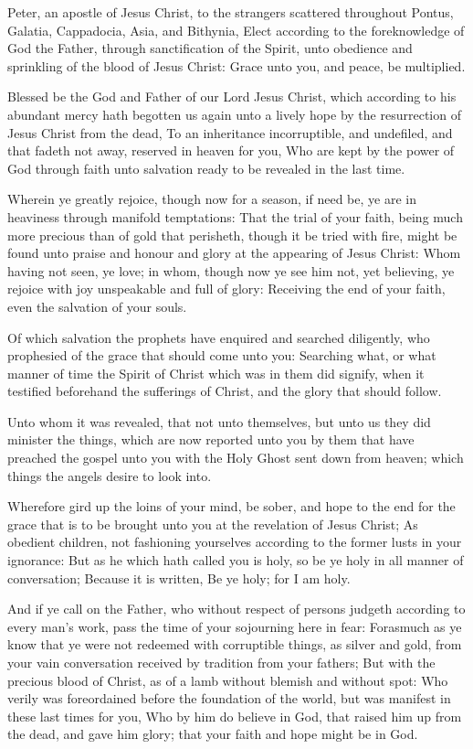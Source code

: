 \Chapter
\Verse Peter, an apostle of Jesus Christ, to the strangers scattered throughout Pontus, Galatia, Cappadocia, Asia, and Bithynia, \Verse Elect according to the foreknowledge of God the Father, through sanctification of the Spirit, unto obedience and sprinkling of the blood of Jesus Christ: Grace unto you, and peace, be multiplied.

\Verse Blessed be the God and Father of our Lord Jesus Christ, which according to his abundant mercy hath begotten us again unto a lively hope by the resurrection of Jesus Christ from the dead, \Verse To an inheritance incorruptible, and undefiled, and that fadeth not away, reserved in heaven for you, \Verse Who are kept by the power of God through faith unto salvation ready to be revealed in the last time.

\Verse Wherein ye greatly rejoice, though now for a season, if need be, ye are in heaviness through manifold temptations: \Verse That the trial of your faith, being much more precious than of gold that perisheth, though it be tried with fire, might be found unto praise and honour and glory at the appearing of Jesus Christ: \Verse Whom having not seen, ye love; in whom, though now ye see him not, yet believing, ye rejoice with joy unspeakable and full of glory: \Verse Receiving the end of your faith, even the salvation of your souls.

\Verse Of which salvation the prophets have enquired and searched diligently, who prophesied of the grace that should come unto you: \Verse Searching what, or what manner of time the Spirit of Christ which was in them did signify, when it testified beforehand the sufferings of Christ, and the glory that should follow.

\Verse Unto whom it was revealed, that not unto themselves, but unto us they did minister the things, which are now reported unto you by them that have preached the gospel unto you with the Holy Ghost sent down from heaven; which things the angels desire to look into.

\Verse Wherefore gird up the loins of your mind, be sober, and hope to the end for the grace that is to be brought unto you at the revelation of Jesus Christ; \Verse As obedient children, not fashioning yourselves according to the former lusts in your ignorance: \Verse But as he which hath called you is holy, so be ye holy in all manner of conversation; \Verse Because it is written, Be ye holy; for I am holy.

\Verse And if ye call on the Father, who without respect of persons judgeth according to every man's work, pass the time of your sojourning here in fear: \Verse Forasmuch as ye know that ye were not redeemed with corruptible things, as silver and gold, from your vain conversation received by tradition from your fathers; \Verse But with the precious blood of Christ, as of a lamb without blemish and without spot: \Verse Who verily was foreordained before the foundation of the world, but was manifest in these last times for you, \Verse Who by him do believe in God, that raised him up from the dead, and gave him glory; that your faith and hope might be in God.

